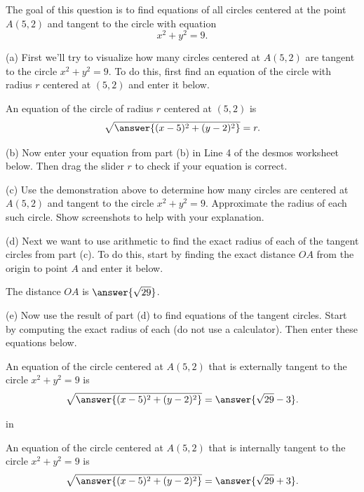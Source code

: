 \documentclass{ximera}
\newcommand{\pskip}{\vskip 0.1 in}
\begin{document}
\begin{question}  \label{Q:DFRr43345t22}
The goal of this question is to find equations of all circles centered at the point $A(5,2)$ and tangent to the circle with equation
\[
    x^2 + y^2 = 9.
\]

(a) First we'll try to visualize how many circles centered at $A(5,2)$ are tangent to the circle $x^2+y^2=9$. To do this, first find an equation of the circle with radius $r$ centered at $(5,2)$ and enter it below.

An equation of the circle of radius $r$ centered at $(5,2)$ is
\[
        \sqrt{\answer{(x-5)^2 + (y-2)^2}} = r .
\]

(b) Now enter your equation from part (b) in Line 4 of the desmos worksheet below. Then drag the slider $r$ to check if your equation is correct.

\begin{onlineOnly}
    \begin{center}
\end{center}
\end{onlineOnly}

\begin{freeResponse}
(c) Use the demonstration above to determine how many circles are centered at $A(5,2)$ and tangent to the circle $x^2+y^2=9$. Approximate the radius of each such circle. Show screenshots to help with your explanation.
\end{freeResponse}

(d) Next we want to use arithmetic to find the exact radius of each of the tangent circles from part (c). To do this, start by finding the exact distance $OA$ from the origin to point $A$ and enter it below.

The distance $OA$ is $\answer{\sqrt{29}}$.

(e) Now use the result of part (d) to find equations of the tangent circles. Start by computing the exact radius of each (do not use a calculator). Then enter these equations below.

An equation of the circle centered at $A(5,2)$ that is externally tangent to the circle $x^2 + y^2 = 9$ is
\[
     \sqrt{\answer{(x-5)^2 + (y-2)^2}} = \answer{\sqrt{29}-3} .
\]

\pskip

An equation of the circle centered at $A(5,2)$ that is internally tangent to the circle $x^2 + y^2 = 9$ is
\[
     \sqrt{\answer{(x-5)^2 + (y-2)^2}} = \answer{\sqrt{29}+3} .
\]



\end{question}
\end{document}
